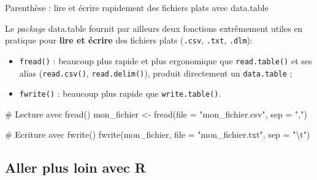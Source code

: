 \documentclass[12pt,ignorenonframetext,]{beamer}
\newenvironment{Shaded}{}{}
\newcommand{\CharTok}[1]{\textcolor[rgb]{0.00,0.50,0.50}{#1}}
\newcommand{\CommentTok}[1]{\textcolor[rgb]{0.00,0.50,0.00}{#1}}
\newcommand{\DataTypeTok}[1]{#1}
\newcommand{\KeywordTok}[1]{\textcolor[rgb]{0.00,0.00,1.00}{#1}}
\newcommand{\NormalTok}[1]{#1}
\newcommand{\StringTok}[1]{\textcolor[rgb]{0.00,0.50,0.50}{#1}}
\providecommand{\tightlist}{%
  \setlength{\itemsep}{0pt}\setlength{\parskip}{0pt}}
\renewenvironment{Shaded}{\begin{snugshade}}{\end{snugshade}}
\newcommand{\intertitre}[1]{\textcolor{redInsee}{\textbf{#1}}}
\begin{document}
\begin{frame}[fragile]{Parenthèse : lire et écrire rapidement des
fichiers plats avec data.table}
\protect\hypertarget{parenthese-lire-et-ecrire-rapidement-des-fichiers-plats-avec-data.table}{}

Le \emph{package} data.table fournit par ailleurs deux fonctions
extrêmement utiles en pratique pour \intertitre{lire et écrire} des
fichiers plats (\texttt{.csv}, \texttt{.txt}, \texttt{.dlm}):

\begin{itemize}
\tightlist
\item
  \pause \texttt{fread()} : beaucoup plus rapide et plus ergonomique que
  \texttt{read.table()} et ses alias (\texttt{read.csv()},
  \texttt{read.delim()}), produit directement un \texttt{data.table} ;
\item
  \pause \texttt{fwrite()} : beaucoup plus rapide que
  \texttt{write.table()}.
\end{itemize}

\footnotesize \pause

\begin{Shaded}
\begin{Highlighting}[]
\CommentTok{# Lecture avec fread()}
\NormalTok{mon_fichier <-}\StringTok{ }\KeywordTok{fread}\NormalTok{(}\DataTypeTok{file =} \StringTok{"mon_fichier.csv"}\NormalTok{, }\DataTypeTok{sep =} \StringTok{","}\NormalTok{)}

\CommentTok{# Ecriture avec fwrite()}
\KeywordTok{fwrite}\NormalTok{(mon_fichier, }\DataTypeTok{file =} \StringTok{"mon_fichier.txt"}\NormalTok{, }\DataTypeTok{sep =} \StringTok{"}\CharTok{\textbackslash{}t}\StringTok{"}\NormalTok{)}
\end{Highlighting}
\end{Shaded}

\end{frame}

\hypertarget{aller-plus-loin-avec-r}{%
\subsection{Aller plus loin avec R}\label{aller-plus-loin-avec-r}}
\end{document}
